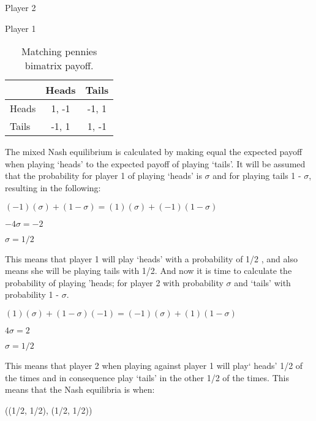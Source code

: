 \begin{table}[H]
\begin{center}
Player 2

Player 1
\begin{tabular}{|l|c|c|}
\hline
 & Heads & Tails\\ 
\hline
Heads & 1, -1 & -1, 1\\
\hline
Tails & -1, 1 & 1, -1\\
\hline
\end{tabular}

\caption{ Matching pennies bimatrix payoff.}
\label{fig:mpnashmx}	
\end{center}
\end{table}

The mixed Nash equilibrium is calculated by making equal the expected payoff  when playing `heads' to the expected payoff of playing `tails'. It will be assumed that the probability for player 1 of playing `heads' is $\sigma$ and for playing tails 1 - $\sigma$, resulting in the following:
\begin{center}
$(-1)(\sigma) + (1 - \sigma) = (1)(\sigma) + (-1)(1 - \sigma)$
\end{center}
\begin{center}
$-4 \sigma = -2$
\end{center}
\begin{center}
$\sigma = 1/2$
\end{center}
This means that player 1 will play `heads' with a probability of 1/2 , and also means she will be playing tails with 1/2. And now it is time to calculate the probability of playing 'heads; for player 2 with probability $\sigma$ and `tails' with probability 1 - $\sigma$.

\begin{center}
$(1)(\sigma) + (1 - \sigma)(-1) = (-1)(\sigma) + (1)(1 - \sigma)$
\end{center}
\begin{center}
$4 \sigma = 2$
\end{center}
\begin{center}
$\sigma = 1/2$
\end{center}

This means that player 2 when playing against player 1 will play` heads'  1/2  of the times and in consequence play `tails' in the other 1/2 of the times. 
This means that the Nash equilibria is when:
\begin{center}
((1/2, 1/2), (1/2, 1/2))
\end{center}

